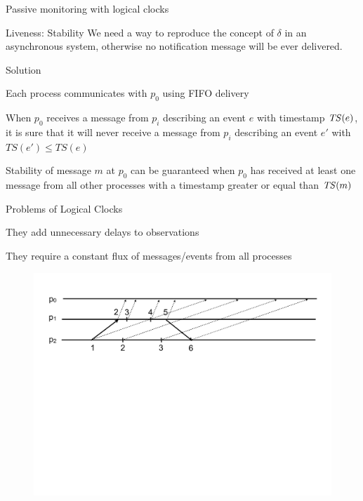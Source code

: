 \begin{frame}{Passive monitoring with logical clocks}

\begin{block}{Liveness: Stability} We need a way to reproduce the concept
	of $\delta$ in an asynchronous system, otherwise no notification message
	will be ever delivered.
\end{block}

\begin{block}{Solution}
\BIL
\item Each process communicates with $p_0$ using FIFO delivery
\item When $p_0$ receives a message from $p_i$ describing an event $e$ 
with timestamp $\mathit{TS}(e)$, it is sure that it will never receive a message
from $p_i$ describing an event $e'$ with $TS(e') \leq TS(e)$
\item Stability of message $m$ at $p_0$ can be guaranteed when $p_0$ has
received at least one message from all other processes with a timestamp
greater or equal than $\mathit{TS}(m)$
\EIL
\end{block}

\end{frame}

\begin{frame}{Problems of Logical Clocks}
\BI
\item They add unnecessary delays to observations
\item They require a constant flux of messages/events from all processes
\EI

\begin{figure}
	\includegraphics[width=12cm]{figs/03/figura.pdf}
\end{figure}

\end{frame}

